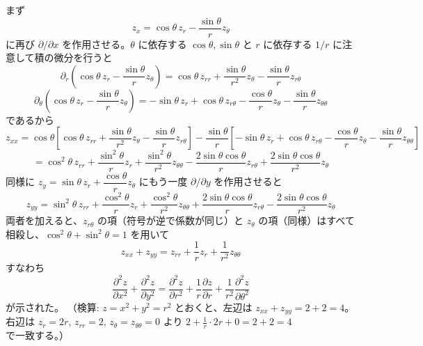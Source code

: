 まず
\[
z_{x} = \cos\theta\, z_{r} - \frac{\sin\theta}{r} z_{\theta}
\]
に再び $\partial/\partial x$ を作用させる。$\theta$ に依存する $\cos\theta,\sin\theta$ と $r$ に依存する $1/r$ に注意して積の微分を行うと
\[
\partial_{r}\left(\cos\theta\,z_{r} - \frac{\sin\theta}{r}z_{\theta}\right)
= \cos\theta\,z_{rr} + \frac{\sin\theta}{r^{2}}z_{\theta} - \frac{\sin\theta}{r}z_{r\theta}
\]
\[
\partial_{\theta}\left(\cos\theta\,z_{r} - \frac{\sin\theta}{r}z_{\theta}\right)
= -\sin\theta\,z_{r} + \cos\theta\,z_{r\theta} - \frac{\cos\theta}{r}z_{\theta} - \frac{\sin\theta}{r}z_{\theta\theta}
\]
であるから
\[
z_{xx} = \cos\theta\left[\cos\theta\,z_{rr} + \frac{\sin\theta}{r^{2}}z_{\theta} - \frac{\sin\theta}{r}z_{r\theta}\right]
- \frac{\sin\theta}{r}\left[-\sin\theta\,z_{r} + \cos\theta\,z_{r\theta} - \frac{\cos\theta}{r}z_{\theta} - \frac{\sin\theta}{r}z_{\theta\theta}\right]
\]
\[
= \cos^{2}\theta\, z_{rr} + \frac{\sin^{2}\theta}{r}z_{r} + \frac{\sin^{2}\theta}{r^{2}}z_{\theta\theta} - \frac{2\sin\theta\cos\theta}{r}z_{r\theta} + \frac{2\sin\theta\cos\theta}{r^{2}}z_{\theta}
\]
同様に $z_{y} = \sin\theta\,z_{r} + \dfrac{\cos\theta}{r}z_{\theta}$ にもう一度 $\partial/\partial y$ を作用させると
\[
z_{yy} = \sin^{2}\theta\, z_{rr} + \frac{\cos^{2}\theta}{r}z_{r} + \frac{\cos^{2}\theta}{r^{2}}z_{\theta\theta} + \frac{2\sin\theta\cos\theta}{r}z_{r\theta} - \frac{2\sin\theta\cos\theta}{r^{2}}z_{\theta}
\]
両者を加えると、$z_{r\theta}$ の項（符号が逆で係数が同じ）と $z_{\theta}$ の項（同様）はすべて相殺し、$\cos^{2}\theta+\sin^{2}\theta=1$ を用いて
\[
z_{xx}+z_{yy} = z_{rr} + \frac{1}{r}z_{r} + \frac{1}{r^{2}}z_{\theta\theta}
\]
すなわち
\[
\boxed{\; \frac{\partial^{2} z}{\partial x^{2}} + \frac{\partial^{2} z}{\partial y^{2}} = \frac{\partial^{2} z}{\partial r^{2}} + \frac{1}{r}\frac{\partial z}{\partial r} + \frac{1}{r^{2}}\frac{\partial^{2} z}{\partial \theta^{2}} \;}
\]
が示された。
（検算: $z=x^{2}+y^{2}=r^{2}$ とおくと、左辺は $z_{xx}+z_{yy}=2+2=4$。右辺は $z_r=2r,\,z_{rr}=2,\,z_\theta=z_{\theta\theta}=0$ より $2+\tfrac{1}{r}\cdot2r+0=2+2=4$ で一致する。）
